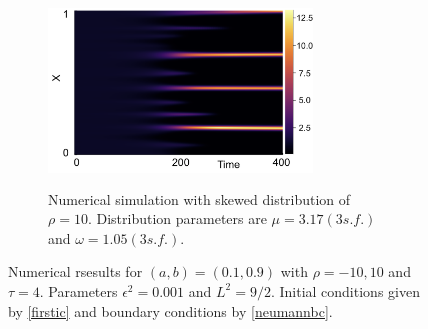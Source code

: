 \begin{figure}[H]
\begin{subfigure}[t]{0.45\textwidth}
    \end{subfigure}
    \hfill
    \begin{subfigure}[t]{0.45\textwidth}
        \centering
        \includegraphics[width=7cm,height=5cm]{fixt4.png}
        \caption{Numerical simulation with skewed distribution of $\rho=10$. Distribution parameters are $\mu=3.17(3 s.f.)$ and $\omega=1.05(3 s.f.)$.}
        \label{}
    \end{subfigure}
    \caption{Numerical rsesults for $(a,b)=(0.1,0.9)$ with $\rho=-10,10$ and $\tau=4$. Parameters $\epsilon^2=0.001$ and $L^2=9/2$. Initial conditions given by \eqref{firstic} and boundary conditions by \eqref{neumannbc}.}
    \label{fig:linskew4}
\end{figure}


